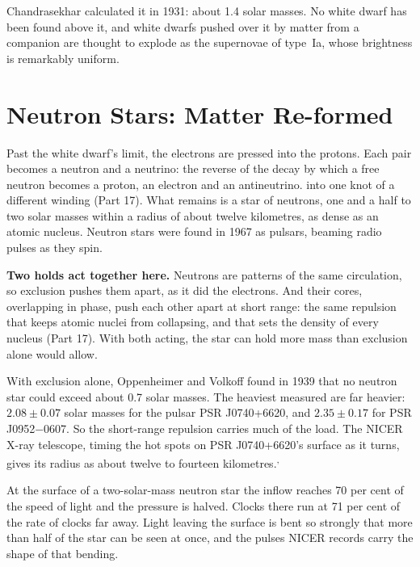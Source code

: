  Chandrasekhar calculated it in 1931: about 1.4 solar masses. No white dwarf has been found above it, and white dwarfs pushed over it by matter from a companion are thought to explode as the supernovae of type~Ia, whose brightness is remarkably uniform.

\section{Neutron Stars: Matter Re-formed}

Past the white dwarf's limit, the electrons are pressed into the protons. Each pair becomes a neutron and a neutrino: the reverse of the decay by which a free neutron becomes a proton, an electron and an antineutrino.  into one knot of a different winding (Part 17). What remains is a star of neutrons, one and a half to two solar masses within a radius of about twelve kilometres, as dense as an atomic nucleus. Neutron stars were found in 1967 as pulsars, beaming radio pulses as they spin.

\begin{hypbar}
\textbf{Two holds act together here.} Neutrons are patterns of the same circulation, so exclusion pushes them apart, as it did the electrons. And their cores, overlapping in phase, push each other apart at short range: the same repulsion that keeps atomic nuclei from collapsing, and that sets the density of every nucleus (Part 17). With both acting, the star can hold more mass than exclusion alone would allow.
\end{hypbar}

 With exclusion alone, Oppenheimer and Volkoff found in 1939 that no neutron star could exceed about 0.7 solar masses. The heaviest measured are far heavier: $2.08\pm0.07$ solar masses for the pulsar PSR J0740+6620, and $2.35\pm0.17$ for PSR J0952$-$0607. So the short-range repulsion carries much of the load. The NICER X-ray telescope, timing the hot spots on PSR J0740+6620's surface as it turns, gives its radius as about twelve to fourteen kilometres.\textsuperscript{,}

At the surface of a two-solar-mass neutron star the inflow reaches 70 per cent of the speed of light and the pressure is halved. Clocks there run at 71 per cent of the rate of clocks far away. Light leaving the surface is bent so strongly that more than half of the star can be seen at once, and the pulses NICER records carry the shape of that bending.

